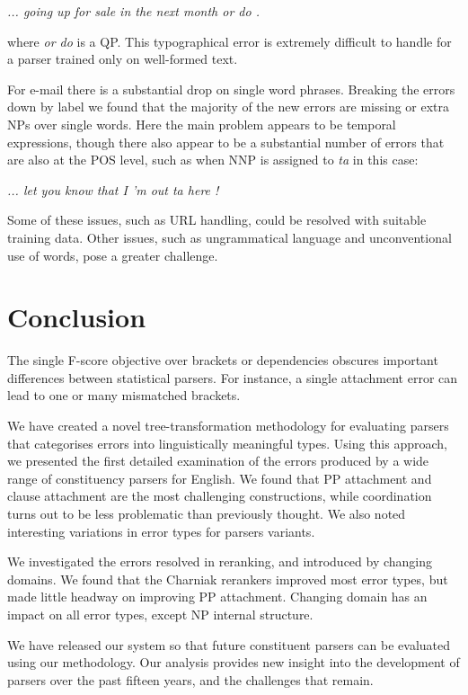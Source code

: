 \vspace{3mm}
\emph{... going up for sale in the next month or do .}
\vspace{3mm}

\noindent where \emph{or do} is a QP.  This typographical error is extremely
difficult to handle for a parser trained only on well-formed text.

For e-mail there is a substantial drop on single word phrases.  Breaking the
errors down by label we found that the majority of the new errors are missing
or extra NPs over single words.  Here the main problem appears to be temporal
expressions, though there also appear to be a substantial number of errors that
are also at the POS level, such as when NNP is assigned to \emph{ta} in this
case:

\vspace{3mm}
\emph{... let you know that I 'm out ta here !}
\vspace{3mm}

Some of these issues, such as URL handling, could be resolved with suitable
training data.  Other issues, such as ungrammatical language and
unconventional use of words, pose a greater challenge.

\section{Conclusion}

The single F-score objective over brackets or dependencies obscures important
differences between statistical parsers. For instance, a single attachment
error can lead to one or many mismatched brackets.

We have created a novel tree-transformation methodology for
evaluating parsers that categorises errors into linguistically meaningful
types.  Using this approach, we presented the first detailed examination of the
errors produced by a wide range of constituency parsers for
English.  We found that PP attachment and clause attachment are the most
challenging constructions, while coordination turns out to be less problematic
than previously thought.  We also noted interesting variations in error types
for parsers variants.

We investigated the errors resolved in reranking, and introduced by changing
domains. We found that the Charniak rerankers improved most error types, but
made little headway on improving PP attachment.  Changing domain has an impact
on all error types, except NP internal structure.

We have released our system so that future constituent parsers can be evaluated
using our methodology.  Our analysis provides new insight into the development
of parsers over the past fifteen years, and the challenges that remain.
